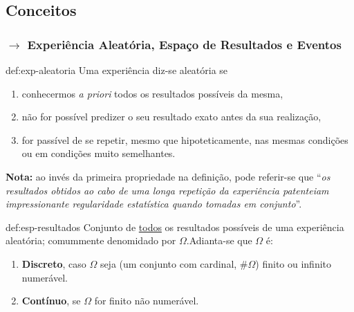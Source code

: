 \def\nLongleftarrow{/\mkern-25mu\Longleftarrow}
\subsection[1.1 Conceitos]{\hspace*{0.075 em}\raisebox{0.2 em}{$\pmb{\drsh}$} Conceitos}
\label{subsec:concepts}
\subsubsection[1.1.1 Experiência Aleatória, Espaço de Resultados e Eventos]{$\pmb{\rightarrow}$ Experiência Aleatória, Espaço de Resultados e Eventos}

\begin{theo}{def:exp-aleatoria}\label{def:exp-aleatoria}
    Uma experiência diz-se aleatória se

    \vspace{-1 em}
    \begin{enumerate}[label=$\bullet$]
        \item conhecermos \textit{a priori} todos os resultados possíveis da mesma,
        \item não for possível predizer o seu resultado exato antes da sua realização,
        \item for passível de se repetir, mesmo que hipoteticamente, nas mesmas condições ou em condições muito semelhantes.
    \end{enumerate}

    \noindent \textbf{Nota:} ao invés da primeira propriedade na definição, pode referir-se que ``\textit{os resultados obtidos ao cabo de uma longa repetição da experiência patenteiam impressionante regularidade estatística quando tomadas em conjunto}''\cite{Morais2020}.
\end{theo}

\begin{theo}{def:esp-resultados}\label{def:esp-resultados}
    Conjunto de \underline{todos} os resultados possíveis de uma experiência aleatória; comummente denomidado por $\Omega$.\footnotemark[1] Adianta-se que $\Omega$ é:
    
    \vspace{-1 em}
    \begin{enumerate}[label=$\bullet$]
        \item \textbf{Discreto}, caso $\Omega$ seja (um conjunto com cardinal, \#$\Omega$) finito ou infinito numerável.
        \item \textbf{Contínuo}, se $\Omega$ for finito não numerável.
    \end{enumerate}
\end{theo}

